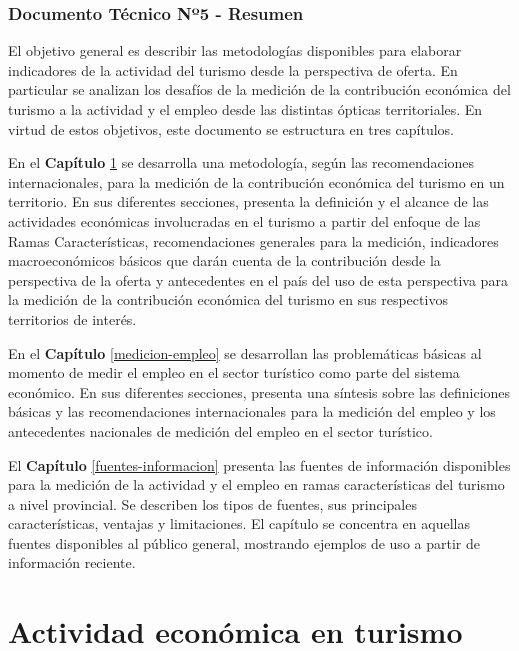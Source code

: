\documentclass[
  openany]{book}
\begin{document}
\hypertarget{documento-tuxe9cnico-nuxba5---resumen}{%
\subsection*{Documento Técnico Nº5 - Resumen}\label{documento-tuxe9cnico-nuxba5---resumen}}

El objetivo general es describir las metodologías disponibles para elaborar indicadores de la actividad del turismo desde la perspectiva de oferta. En particular se analizan los desafíos de la medición de la contribución económica del turismo a la actividad y el empleo desde las distintas ópticas territoriales. En virtud de estos objetivos, este documento se estructura en tres capítulos.

En el \textbf{Capítulo} \ref{medicion-actividad} se desarrolla una metodología, según las recomendaciones internacionales, para la medición de la contribución económica del turismo en un territorio. En sus diferentes secciones, presenta la definición y el alcance de las actividades económicas involucradas en el turismo a partir del enfoque de las Ramas Características, recomendaciones generales para la medición, indicadores macroeconómicos básicos que darán cuenta de la contribución desde la perspectiva de la oferta y antecedentes en el país del uso de esta perspectiva para la medición de la contribución económica del turismo en sus respectivos territorios de interés.

En el \textbf{Capítulo} \ref{medicion-empleo} se desarrollan las problemáticas básicas al momento de medir el empleo en el sector turístico como parte del sistema económico. En sus diferentes secciones, presenta una síntesis sobre las definiciones básicas y las recomendaciones internacionales para la medición del empleo y los antecedentes nacionales de medición del empleo en el sector turístico.

El \textbf{Capítulo} \ref{fuentes-informacion} presenta las fuentes de información disponibles para la medición de la actividad y el empleo en ramas características del turismo a nivel provincial. Se describen los tipos de fuentes, sus principales características, ventajas y limitaciones. El capítulo se concentra en aquellas fuentes disponibles al público general, mostrando ejemplos de uso a partir de información reciente.

\hypertarget{medicion-actividad}{%
\chapter{\texorpdfstring{\textbf{Actividad económica en turismo}}{Actividad económica en turismo}}\label{medicion-actividad}}
\end{document}
